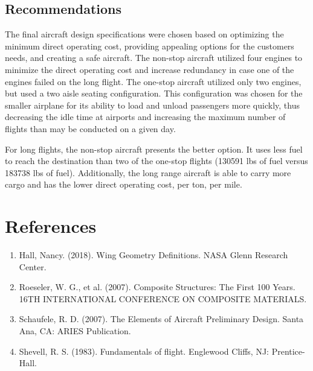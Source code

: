 \documentclass{article}
\begin{document}
    \subsection{Recommendations}
    \label{sec:Recommendations}
        \begin{flushleft}
            The final aircraft design specifications were chosen based on
            optimizing the minimum direct operating cost, providing appealing
            options for the customers needs, and creating a safe aircraft. The
            non-stop aircraft utilized four engines to minimize the direct
            operating cost and increase redundancy in case one of the engines
            failed on the long flight. The one-stop aircraft utilized only two
            engines, but used a two aisle seating configuration. This
            configuration was chosen for the smaller airplane for its ability to
            load and unload passengers more quickly, thus decreasing the idle
            time at airports and increasing the maximum number of flights than
            may be conducted on a given day.

            For long flights, the non-stop aircraft presents the better option.
            It uses less fuel to reach the destination than two of the one-stop
            flights (130591 lbs of fuel versus 183738 lbs of fuel). Additionally,
            the long range aircraft is able to carry more cargo and has the
            lower direct operating cost, per ton, per mile.
        \end{flushleft}

    \pagebreak
    \section{References}
        \begin{flushleft}
            \begin{enumerate}
                \item Hall, Nancy. (2018). Wing Geometry Definitions. NASA Glenn Research Center.
                \item Roeseler, W. G., et al. (2007). Composite Structures: The First 100 Years. 16TH INTERNATIONAL CONFERENCE ON COMPOSITE MATERIALS.
                \item Schaufele, R. D. (2007). The Elements of Aircraft Preliminary Design. Santa Ana, CA: ARIES Publication.
                \item Shevell, R. S. (1983). Fundamentals of flight. Englewood Cliffs, NJ: Prentice-Hall.
            \end{enumerate}
        \end{flushleft}
\end{document}
